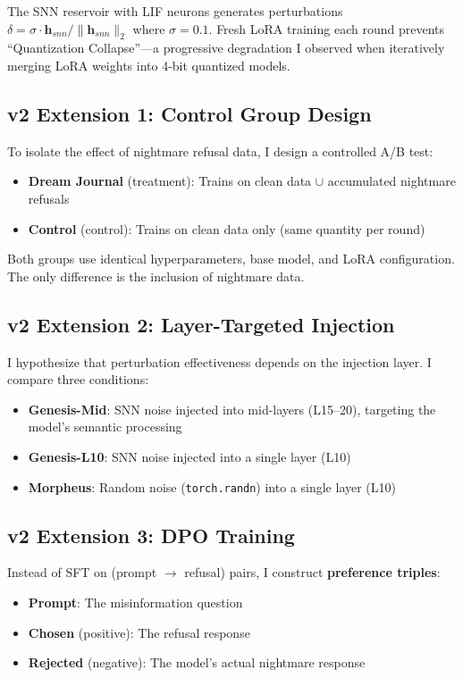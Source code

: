 \documentclass[11pt,a4paper]{article}
\begin{document}
The SNN reservoir with LIF neurons generates perturbations $\delta = \sigma \cdot \mathbf{h}_{snn} / \|\mathbf{h}_{snn}\|_2$ where $\sigma = 0.1$. Fresh LoRA training each round prevents ``Quantization Collapse''---a progressive degradation I observed when iteratively merging LoRA weights into 4-bit quantized models.

\subsection{v2 Extension 1: Control Group Design}

To isolate the effect of nightmare refusal data, I design a controlled A/B test:
\begin{itemize}
    \item \textbf{Dream Journal} (treatment): Trains on clean data $\cup$ accumulated nightmare refusals
    \item \textbf{Control} (control): Trains on clean data only (same quantity per round)
\end{itemize}
Both groups use identical hyperparameters, base model, and LoRA configuration. The only difference is the inclusion of nightmare data.

\subsection{v2 Extension 2: Layer-Targeted Injection}

I hypothesize that perturbation effectiveness depends on the injection layer. I compare three conditions:
\begin{itemize}
    \item \textbf{Genesis-Mid}: SNN noise injected into mid-layers (L15--20), targeting the model's semantic processing
    \item \textbf{Genesis-L10}: SNN noise injected into a single layer (L10)
    \item \textbf{Morpheus}: Random noise (\texttt{torch.randn}) into a single layer (L10)
\end{itemize}

\subsection{v2 Extension 3: DPO Training}

Instead of SFT on (prompt $\to$ refusal) pairs, I construct \textbf{preference triples}:
\begin{itemize}
    \item \textbf{Prompt}: The misinformation question
    \item \textbf{Chosen} (positive): The refusal response
    \item \textbf{Rejected} (negative): The model's actual nightmare response
\end{itemize}
\end{document}
